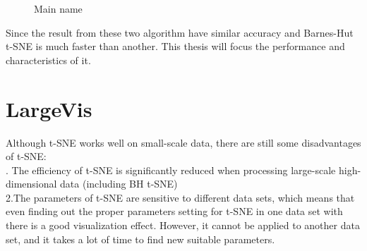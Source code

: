 \begin{figure}[H]
\centering  %
\caption{Main name}
\label{Fig.main}
\end{figure}

\noindent Since the result from these two algorithm have similar accuracy and Barnes-Hut t-SNE is much faster than another. This thesis will focus the performance and characteristics of it.


\chapter{LargeVis}



\noindent  Although t-SNE works well on small-scale data, there are still some disadvantages of t-SNE:\\

. The efficiency of t-SNE is significantly reduced when processing large-scale high-dimensional data (including BH t-SNE)\\

\noindent 2.The parameters of t-SNE are sensitive to different data sets, which means that even finding out the proper parameters setting for t-SNE in one data set with there is a good visualization effect. However, it cannot be applied to another data set, and it takes a lot of time to find new suitable parameters.\\

